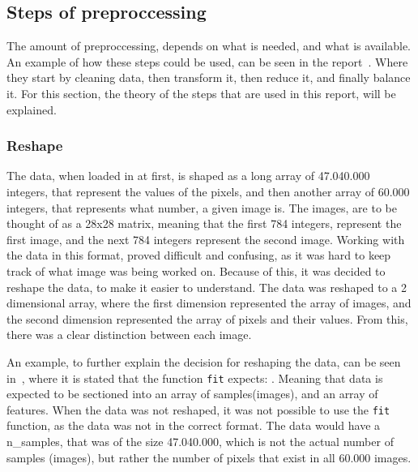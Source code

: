   
  
\subsection{Steps of preproccessing}\label{subsec:preprocessing-steps}
The amount of preproccessing, depends on what is needed, and what is available. An example of how these steps could be used, can be seen in the report~\cite{Data-preprocessing-for-flight-delays}. Where they start by cleaning data, then transform it, then reduce it, and finally balance it. For this section, the theory of the steps that are used in this report, will be explained.

  

\subsubsection{Reshape}\label{subsec:preprocessing-reshape}
The data, when loaded in at first, is shaped as a long array of 47.040.000 integers, that represent the values of the pixels, and then another array of 60.000 integers, that represents what number, a given image is. The images, are to be thought of as a 28x28 matrix, meaning that the first 784 integers, represent the first image, and the next 784 integers represent the second image. Working with the data in this format, proved difficult and confusing, as it was hard to keep track of what image was being worked on. Because of this, it was decided to reshape the data, to make it easier to understand. The data was reshaped to a 2 dimensional array, where the first dimension represented the array of images, and the second dimension represented the array of pixels and their values. From this, there was a clear distinction between each image.

  
An example, to further explain the decision for reshaping the data, can be seen in~\cite{scikit-learn-PCA}, where it is stated that the function \texttt{fit} expects: . Meaning that data is expected to be sectioned into an array of samples(images), and an array of features. When the data was not reshaped, it was not possible to use the \texttt{fit} function, as the data was not in the correct format. The data would have a n\_samples, that was of the size 47.040.000, which is not the actual number of samples (images), but rather the number of pixels that exist in all 60.000 images.



  

